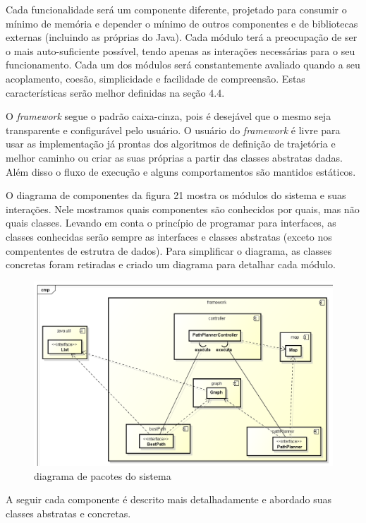 Cada funcionalidade será um componente diferente, projetado para consumir o mínimo de memória e depender o mínimo de outros componentes e de bibliotecas externas (incluindo as próprias do Java). Cada módulo terá a preocupação de ser o mais auto-suficiente possível, tendo apenas as interações necessárias para o seu funcionamento. Cada um dos módulos será constantemente avaliado quando a seu acoplamento, coesão,  simplicidade e facilidade de compreensão. Estas características serão melhor definidas na seção 4.4.

O \textit{framework} segue o padrão caixa-cinza, pois é desejável que o mesmo seja transparente e configurável pelo usuário. O usuário do \textit{framework} é livre para usar as implementação já prontas dos algoritmos de definição de trajetória e melhor caminho ou criar as suas próprias a partir das classes abstratas dadas. Além disso o fluxo de execução e alguns comportamentos são mantidos estáticos.

O diagrama de componentes da figura 21 mostra os módulos do sistema e suas interações. Nele mostramos quais componentes são conhecidos por quais, mas não quais classes. Levando em conta o princípio de programar para interfaces, as classes conhecidas serão sempre as interfaces e classes abstratas (exceto nos compententes de estrutra de dados). Para simplificar o diagrama, as classes concretas foram retiradas e criado um diagrama para detalhar cada módulo.

\begin{figure}[h]
	\centering
	\label{fig21}
		\includegraphics[keepaspectratio=true,scale=0.4]{figuras/componentes.png}
	\caption{diagrama de pacotes do sistema}
\end{figure}

A seguir cada componente é descrito mais detalhadamente e abordado suas classes abstratas e concretas.

